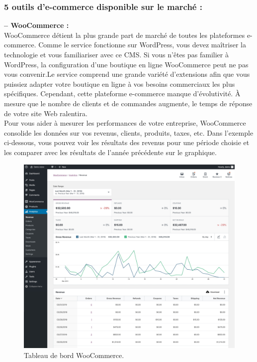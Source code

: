 \documentclass[a4paper, 12pt]{report}
\begin{document}
\subsubsection{5 outils d'e-commerce disponible sur le marché : } 
\textbf{-- WooCommerce :}\\
WooCommerce détient la plus grande part de marché de toutes les plateformes e-commerce. Comme le service fonctionne sur WordPress, vous devez maîtriser la technologie et vous familiariser avec ce CMS. Si vous n'êtes pas familier à WordPress, la configuration d'une boutique en ligne WooCommerce peut ne pas vous convenir.Le service comprend une grande variété d'extensions afin que vous puissiez adapter votre boutique en ligne à vos besoins commerciaux les plus spécifiques. Cependant, cette plateforme e-commerce manque d'évolutivité. À mesure que le nombre de clients et de commandes augmente, le temps de réponse de votre site Web ralentira.\\

Pour vous aider à mesurer les performances de votre entreprise, WooCommerce consolide les données sur vos revenus, clients, produits, taxes, etc. Dans l'exemple ci-dessous, vous pouvez voir les résultats des revenus pour une période choisie et les comparer avec les résultats de l'année précédente sur le graphique.
\begin{figure}[H]
    \centering
    \includegraphics[width = 1\linewidth]{img/ecommerce-platform-woocommerce.png}
    \caption{Tableau de bord WooCommerce.}
\end{figure}
\end{document}
